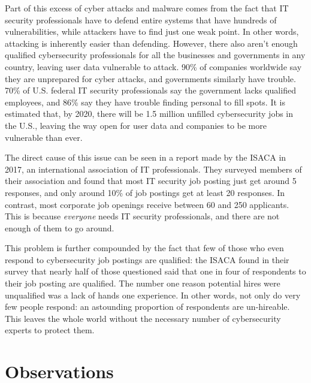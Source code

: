 \documentclass[openright]{report}
\begin{document}
\par Part of this excess of cyber attacks and malware comes from the fact that IT security professionals have to defend entire systems that have hundreds of vulnerabilities, while attackers have to find just one weak point. In other words, attacking is inherently easier than defending. However, there also aren't enough qualified cybersecurity professionals for all the businesses and governments in any country, leaving user data vulnerable to attack. 90\% of companies worldwide say they are unprepared for cyber attacks, and governments similarly have trouble. 70\% of U.S. federal IT security professionals say the government lacks qualified employees, and 86\% say they have trouble finding personal to fill spots\cite{fed_cs_jobs}. It is estimated that, by 2020, there will be 1.5 million unfilled cybersecurity jobs in the U.S., leaving the way open for user data and companies to be more vulnerable than ever\cite{why_no_cyber_classes}.

\par The direct cause of this issue can be seen in a report made by the ISACA in 2017, an international association of IT professionals. They surveyed members of their association and found that most IT security job posting just get around 5 responses, and only around 10\% of job postings get at least 20 responses. In contrast, most corporate job openings receive between 60 and 250 applicants\cite{job_survey}. This is because \textit{everyone} needs IT security professionals, and there are not enough of them to go around.

\par This problem is further compounded by the fact that few of those who even respond to cybersecurity job postings are qualified: the ISACA found in their survey that nearly half of those questioned said that one in four of respondents to their job posting are qualified. The number one reason potential hires were unqualified was a lack of hands one experience\cite{job_survey}. In other words, not only do very few people respond: an astounding proportion of respondents are un-hireable. This leaves the whole world without the necessary number of cybersecurity experts to protect them.

\section{Observations}
\end{document}
